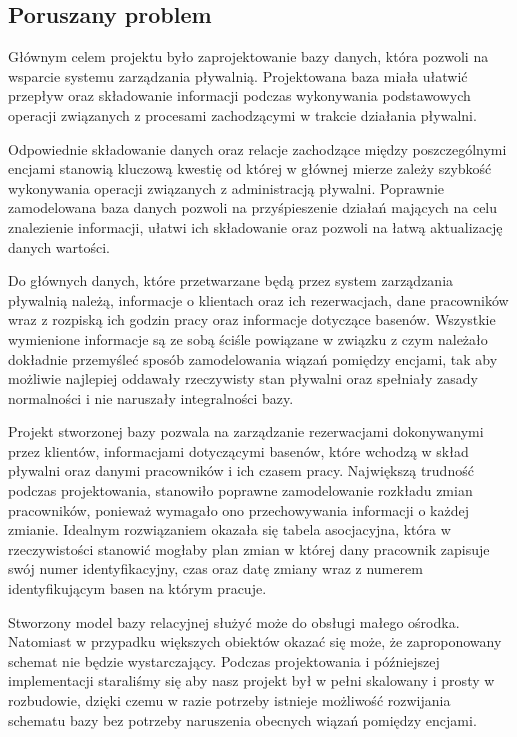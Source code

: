 \documentclass[a4paper]{article}
\begin{document}
\subsection{Poruszany problem}

Głównym celem projektu było zaprojektowanie bazy danych, która pozwoli na wsparcie systemu zarządzania pływalnią. Projektowana baza miała ułatwić przepływ oraz składowanie informacji podczas wykonywania podstawowych operacji związanych z procesami zachodzącymi w trakcie działania pływalni.

Odpowiednie składowanie danych oraz relacje zachodzące między poszczególnymi encjami stanowią kluczową kwestię od której w głównej mierze zależy szybkość wykonywania operacji związanych z administracją pływalni. Poprawnie zamodelowana baza danych pozwoli na przyśpieszenie działań mających na celu znalezienie informacji, ułatwi ich składowanie oraz pozwoli na łatwą aktualizację danych wartości.

Do głównych danych, które przetwarzane będą przez system zarządzania pływalnią należą, informacje o klientach oraz ich rezerwacjach, dane pracowników wraz z rozpiską ich godzin pracy oraz informacje dotyczące basenów. Wszystkie wymienione informacje są ze sobą ściśle powiązane w związku z czym należało dokładnie przemyśleć sposób zamodelowania wiązań pomiędzy encjami, tak aby możliwie najlepiej oddawały rzeczywisty stan pływalni oraz spełniały zasady normalności i nie naruszały integralności bazy.

Projekt stworzonej bazy pozwala na zarządzanie rezerwacjami dokonywanymi przez klientów, informacjami dotyczącymi basenów, które wchodzą w skład pływalni oraz danymi pracowników i ich czasem pracy. Największą trudność podczas projektowania, stanowiło poprawne zamodelowanie rozkładu zmian pracowników, ponieważ wymagało ono przechowywania informacji o każdej zmianie. Idealnym rozwiązaniem okazała się tabela asocjacyjna, która w rzeczywistości stanowić mogłaby plan zmian w której dany pracownik zapisuje swój numer identyfikacyjny, czas oraz datę zmiany wraz z numerem identyfikującym basen na którym pracuje.

Stworzony model bazy relacyjnej służyć może do obsługi małego ośrodka. Natomiast w przypadku większych obiektów okazać się może, że zaproponowany schemat nie będzie wystarczający. Podczas projektowania i późniejszej implementacji staraliśmy się aby nasz projekt był w pełni skalowany i prosty w rozbudowie, dzięki czemu w razie potrzeby istnieje możliwość rozwijania schematu bazy bez potrzeby naruszenia obecnych wiązań pomiędzy encjami.
\end{document}

